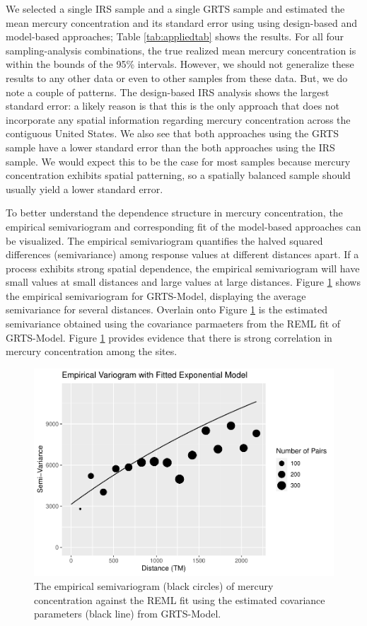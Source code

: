 \documentclass[]{elsarticle} %
\begin{document}
We selected a single IRS sample and a single GRTS sample and estimated
the mean mercury concentration and its standard error using using
design-based and model-based approaches; Table \ref{tab:appliedtab}
shows the results. For all four sampling-analysis combinations, the true
realized mean mercury concentration is within the bounds of the 95\%
intervals. However, we should not generalize these results to any other
data or even to other samples from these data. But, we do note a couple
of patterns. The design-based IRS analysis shows the largest standard
error: a likely reason is that this is the only approach that does not
incorporate any spatial information regarding mercury concentration
across the contiguous United States. We also see that both approaches
using the GRTS sample have a lower standard error than the both
approaches using the IRS sample. We would expect this to be the case for
most samples because mercury concentration exhibits spatial patterning,
so a spatially balanced sample should usually yield a lower standard
error.

To better understand the dependence structure in mercury concentration,
the empirical semivariogram and corresponding fit of the model-based
approaches can be visualized. The empirical semivariogram quantifies the
halved squared differences (semivariance) among response values at
different distances apart. If a process exhibits strong spatial
dependence, the empirical semivariogram will have small values at small
distances and large values at large distances. Figure \ref{fig:figsv}
shows the empirical semivariogram for GRTS-Model, displaying the average
semivariance for several distances. Overlain onto Figure \ref{fig:figsv}
is the estimated semivariance obtained using the covariance parmaeters
from the REML fit of GRTS-Model. Figure \ref{fig:figsv} provides
evidence that there is strong correlation in mercury concentration among
the sites.

\begin{figure}

{\centering \includegraphics[width=0.85\linewidth]{manuscript_files/figure-latex/figsv-1} 

}

\caption{The empirical semivariogram (black circles) of mercury concentration against the REML fit using the estimated covariance parameters (black line) from GRTS-Model.}\label{fig:figsv}
\end{figure}
\end{document}
